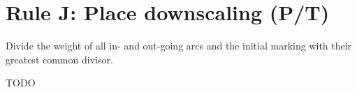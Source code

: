 \section*{Rule J: Place downscaling (P/T)}\label{sec:rule_j}

Divide the weight of all in- and out-going arcs and the initial marking with their greatest common divisor.

TODO